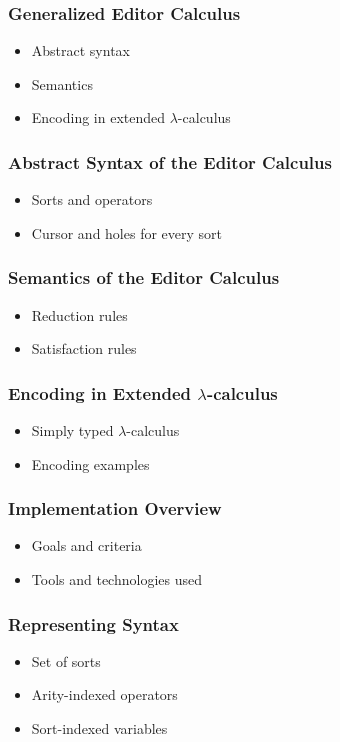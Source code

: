 \documentclass[t,24pt,aspectratio=169]{beamer}
\begin{document}
\begin{frame}[hvid]
    \frametitle{Generalized Editor Calculus}
    \begin{itemize}
        \item Abstract syntax
        \item Semantics
        \item Encoding in extended $\lambda$-calculus
    \end{itemize}
\end{frame}

\begin{frame}[hvid]
    \frametitle{Abstract Syntax of the Editor Calculus}
    \begin{itemize}
        \item Sorts and operators
        \item Cursor and holes for every sort
    \end{itemize}
\end{frame}

\begin{frame}[hvid]
    \frametitle{Semantics of the Editor Calculus}
    \begin{itemize}
        \item Reduction rules
        \item Satisfaction rules
    \end{itemize}
\end{frame}

\begin{frame}[hvid]
    \frametitle{Encoding in Extended $\lambda$-calculus}
    \begin{itemize}
        \item Simply typed $\lambda$-calculus
        \item Encoding examples
    \end{itemize}
\end{frame}

\begin{frame}[hvid]
    \frametitle{Implementation Overview}
    \begin{itemize}
        \item Goals and criteria
        \item Tools and technologies used
    \end{itemize}
\end{frame}

\begin{frame}[hvid]
    \frametitle{Representing Syntax}
    \begin{itemize}
        \item Set of sorts
        \item Arity-indexed operators
        \item Sort-indexed variables
    \end{itemize}
\end{frame}
\end{document}
